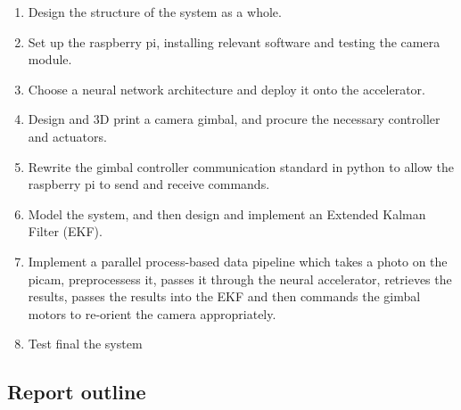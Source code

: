 \begin{enumerate}
\item Design the structure of the system as a whole.
\item Set up the raspberry pi, installing relevant software and testing the camera module.
\item Choose a neural network architecture and deploy it onto the accelerator.
\item Design and 3D print a camera gimbal, and procure the necessary controller and actuators.
\item Rewrite the gimbal controller communication standard in python to allow the raspberry pi to send and receive commands.
\item Model the system, and then design and implement an Extended Kalman Filter (EKF).
\item Implement a parallel process-based data pipeline which takes a photo on the picam, preprocessess it, passes it through the neural accelerator, retrieves the results, passes the results into the EKF and then commands the gimbal motors to re-orient the camera appropriately.
\item Test final the system
\end{enumerate}

\subsection{Report outline}


